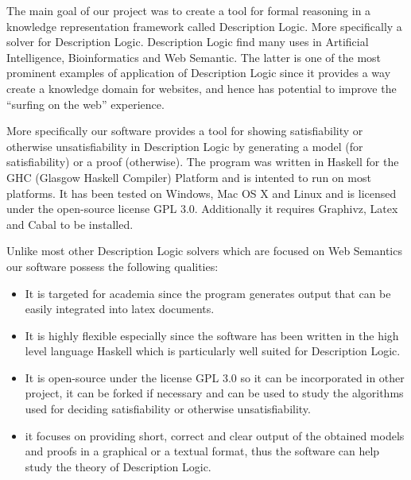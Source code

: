 
The main goal of our project was to create a tool for formal reasoning
in a knowledge representation framework called Description Logic. More
specifically a solver for Description Logic. Description Logic find
many uses in Artificial Intelligence, Bioinformatics and Web
Semantic. The latter is one of the most prominent examples of
application of Description Logic since it provides a way create a
knowledge domain for websites, and hence has potential to improve the
``surfing on the web'' experience.

More specifically our software provides a tool for showing
satisfiability or otherwise unsatisfiability in Description Logic by
generating a model (for satisfiability) or a proof (otherwise). The
program was written in Haskell for the GHC (Glasgow Haskell Compiler)
Platform and is intented to run on most platforms. It has been tested
on Windows, Mac OS X and Linux and is licensed under the open-source
license GPL 3.0. Additionally it requires Graphivz, Latex and Cabal to
be installed.

Unlike most other Description Logic solvers which are focused on Web
Semantics our software possess the following qualities: 

\begin{itemize}
\item It is targeted for academia since the program generates output
  that can be easily integrated into latex documents.
\item It is highly flexible especially since the software has been
  written in the high level language Haskell which is particularly
  well suited for Description Logic.
\item It is open-source under the license GPL 3.0 so it can be
  incorporated in other project, it can be forked if necessary and can
  be used to study the algorithms used for deciding satisfiability or
  otherwise unsatisfiability.
\item it focuses on providing short, correct and clear output of the
  obtained models and proofs in a graphical or a textual format, thus
  the software can help study the theory of Description Logic.
\end{itemize}

